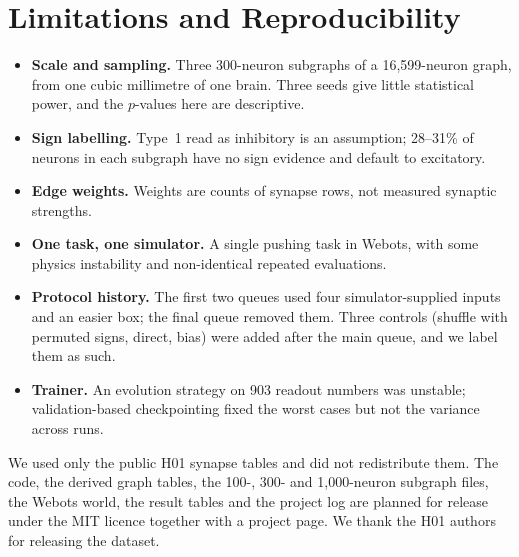 \documentclass[11pt]{article}
\begin{document}
\section{Limitations and Reproducibility}\label{sec:limits}
\begin{itemize}
\item \textbf{Scale and sampling.} Three 300-neuron subgraphs of a 16,599-neuron graph, from one cubic millimetre of one brain. Three seeds give little statistical power, and the $p$-values here are descriptive.
\item \textbf{Sign labelling.} Type~1 read as inhibitory is an assumption; 28--31\% of neurons in each subgraph have no sign evidence and default to excitatory.
\item \textbf{Edge weights.} Weights are counts of synapse rows, not measured synaptic strengths.
\item \textbf{One task, one simulator.} A single pushing task in Webots, with some physics instability and non-identical repeated evaluations.
\item \textbf{Protocol history.} The first two queues used four simulator-supplied inputs and an easier box; the final queue removed them. Three controls (shuffle with permuted signs, direct, bias) were added after the main queue, and we label them as such.
\item \textbf{Trainer.} An evolution strategy on 903 readout numbers was unstable; validation-based checkpointing fixed the worst cases but not the variance across runs.
\end{itemize}
We used only the public H01 synapse tables \citep{shapsoncoe2024h01} and did not redistribute them. The code, the derived graph tables, the 100-, 300- and 1,000-neuron subgraph files, the Webots world, the result tables and the project log are planned for release under the MIT licence together with a project page. We thank the H01 authors for releasing the dataset.



\end{document}
